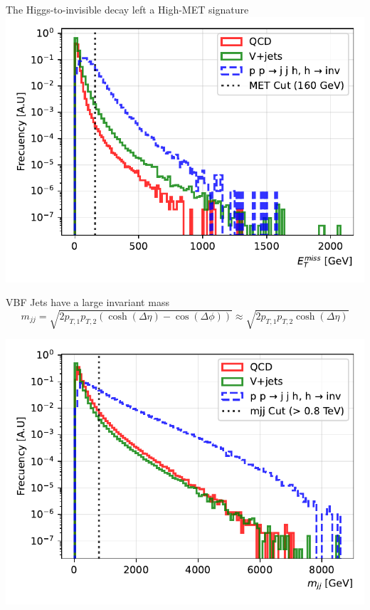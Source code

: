 \documentclass{../../bredelebeamer}
\begin{document}
\begin{frame}{The Higgs-to-invisible decay left a High-MET signature}
    \includegraphics[width=\textwidth]{../Images/met_comparison.pdf}
\end{frame}

\begin{frame}{VBF Jets have a large invariant mass}
    $$
    m_{jj} = \sqrt{2 p_{T,1} p_{T,2} \left( \cosh(\Delta\eta) - \cos(\Delta\phi) \right)}
    \approx \sqrt{2 p_{T,1} p_{T,2} \cosh(\Delta\eta)}
    $$
    \begin{minipage}{0.9\textwidth}
        \includegraphics[width=\textwidth]{../Images/dijet_mass_comparison.pdf}
    \end{minipage}
\end{frame}
\end{document}
